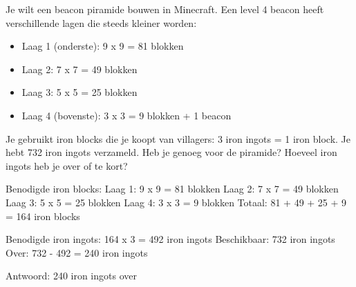 \begin{opgave}
Je wilt een beacon piramide bouwen in Minecraft. Een level 4 beacon heeft verschillende
lagen die steeds kleiner worden:

\begin{itemize}
\item Laag 1 (onderste): 9 x 9 = 81 blokken
\item Laag 2: 7 x 7 = 49 blokken
\item Laag 3: 5 x 5 = 25 blokken
\item Laag 4 (bovenste): 3 x 3 = 9 blokken + 1 beacon
\end{itemize}

Je gebruikt iron blocks die je koopt van villagers: 3 iron ingots = 1 iron block.
Je hebt 732 iron ingots verzameld. Heb je genoeg voor de piramide? Hoeveel iron
ingots heb je over of te kort?
\end{opgave}

\begin{oplossing}
Benodigde iron blocks:
Laag 1: 9 x 9 = 81 blokken
Laag 2: 7 x 7 = 49 blokken
Laag 3: 5 x 5 = 25 blokken
Laag 4: 3 x 3 = 9 blokken
Totaal: 81 + 49 + 25 + 9 = 164 iron blocks

Benodigde iron ingots: 164 x 3 = 492 iron ingots
Beschikbaar: 732 iron ingots
Over: 732 - 492 = 240 iron ingots

Antwoord: 240 iron ingots over
\end{oplossing}